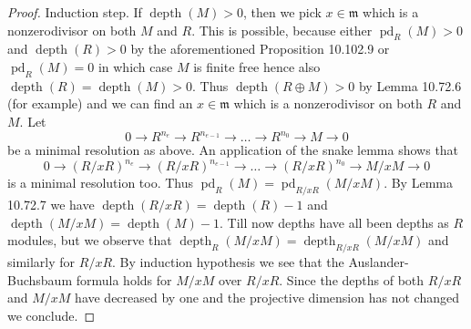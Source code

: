 \begin{proof}
Induction step. If $\operatorname{depth}(M)>0$, then we pick $x\in\mathfrak m$ which is a nonzerodivisor on both $M$ and $R$. This is possible, because either $\operatorname{pd}_R(M)>0$ and $\operatorname{depth}(R)>0$ by the aforementioned Proposition 10.102.9 or $\operatorname{pd}_R(M)=0$ in which case $M$ is finite free hence also $\operatorname{depth}(R)=\operatorname{depth}(M)>0$. Thus $\operatorname{depth}(R\oplus M)>0$ by Lemma 10.72.6 (for example) and we can find an $x\in\mathfrak m$ which is a nonzerodivisor on both $R$ and $M$. Let
\[
0\to R^{n_e}\to R^{n_{e-1}}\to\ldots\to R^{n_0}\to M\to0
\]
be a minimal resolution as above. An application of the snake lemma shows that
\[
0\to(R/xR)^{n_e}\to(R/xR)^{n_{e-1}}\to\ldots\to(R/xR)^{n_0}\to M/xM\to0
\]
is a minimal resolution too. Thus $\operatorname{pd}_R(M)=\operatorname{pd}_{R/xR}(M/xM)$. By Lemma 10.72.7 we have $\operatorname{depth}(R/xR)=\operatorname{depth}(R)-1$ and $\operatorname{depth}(M/xM)=\operatorname{depth}(M)-1$. Till now depths have all been depths as $R$ modules, but we observe that $\operatorname{depth}_R(M/xM)=\operatorname{depth}_{R/xR}(M/xM)$ and similarly for $R/xR$. By induction hypothesis we see that the Auslander-Buchsbaum formula holds for $M/xM$ over $R/xR$. Since the depths of both $R/xR$ and $M/xM$ have decreased by one and the projective dimension has not changed we conclude.
\end{proof}
